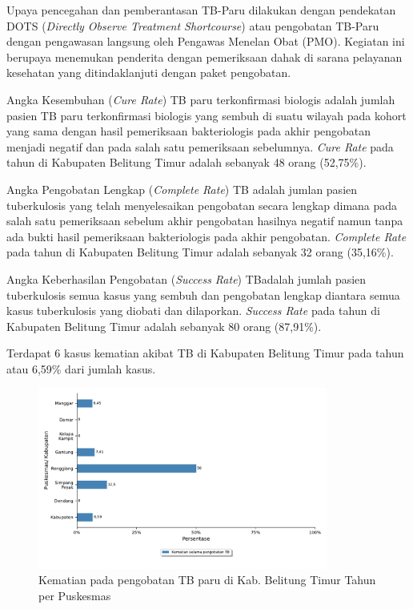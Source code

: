 Upaya pencegahan dan pemberantasan TB-Paru dilakukan dengan pendekatan
DOTS (\emph{Directly Observe Treatment Shortcourse}) atau pengobatan TB-Paru
dengan pengawasan langsung oleh Pengawas Menelan Obat (PMO). Kegiatan
ini berupaya menemukan penderita dengan pemeriksaan dahak di sarana
pelayanan kesehatan yang ditindaklanjuti dengan paket pengobatan.

Angka Kesembuhan (\emph{Cure Rate}) TB paru terkonfirmasi biologis adalah jumlah pasien TB paru terkonfirmasi biologis yang sembuh di suatu wilayah pada kohort yang sama dengan hasil pemeriksaan bakteriologis pada akhir pengobatan menjadi negatif dan pada salah satu pemeriksaan sebelumnya.
\emph{Cure Rate} pada tahun \tP di Kabupaten Belitung Timur adalah sebanyak 48 orang (52,75\%).

Angka Pengobatan Lengkap (\emph{Complete Rate}) TB adalah jumlan pasien tuberkulosis yang telah menyelesaikan pengobatan secara lengkap dimana pada salah satu pemeriksaan sebelum akhir pengobatan hasilnya negatif namun tanpa ada bukti hasil pemeriksaan bakteriologis pada akhir pengobatan.
\emph{Complete Rate} pada tahun \tP di Kabupaten Belitung Timur adalah sebanyak 32 orang (35,16\%).

Angka Keberhasilan Pengobatan (\emph{Success Rate}) TBadalah jumlah pasien tuberkulosis semua kasus yang sembuh dan pengobatan lengkap diantara semua kasus tuberkulosis yang diobati dan dilaporkan.
\emph{Success Rate} pada tahun \tP di Kabupaten Belitung Timur adalah sebanyak 80 orang (87,91\%).

Terdapat 6 kasus kematian akibat TB di Kabupaten Belitung Timur pada tahun \tPnos atau 6,59\% dari jumlah kasus.

\begin{figure}[H]
	\centering
	\includegraphics[width=0.85\textwidth]{bab_06/bab_06_01c_kematianTB}
	\caption{Kematian pada pengobatan TB paru di Kab. Belitung Timur Tahun \tP per Puskesmas}
	\label{fig:kematian-TB}
\end{figure}

